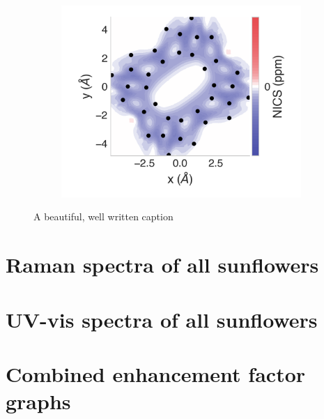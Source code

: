 \documentclass[
	fontsize=10pt, %
	twoside=true, %
	numbers=noenddot, %
]{kaobook}
\begin{document}
\begin{figure}[h]
\begin{subfigure}{5.5cm}\centering\includegraphics{pn12-2d}\end{subfigure}
\caption[short]{A beautiful, well written caption}
\end{figure}

\newpage
\section{Raman spectra of all sunflowers}

\newpage
\section{UV-vis spectra of all sunflowers}

\newpage
\section{Combined enhancement factor graphs}
\end{document}
